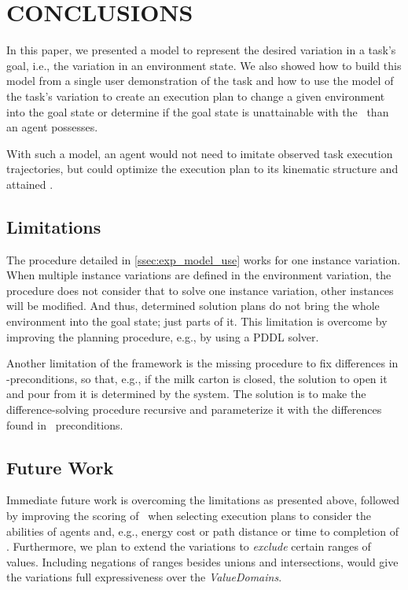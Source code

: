 \section{CONCLUSIONS}
In this paper, we presented a model to represent the desired variation in a task's goal, i.e., the variation in an environment state. We also showed how to build this model from a single user demonstration of the task and how to use the model of the task's variation to create an execution plan to change a given environment into the goal state or determine if the goal state is unattainable with the \skills\ than an agent possesses.

With such a model, an agent would not need to imitate observed task execution trajectories, but could optimize the execution plan to its kinematic structure and attained \skills.

\subsection{Limitations}
The procedure detailed in \ref{ssec:exp_model_use} works for one instance variation. When multiple instance variations are defined in the environment variation, the procedure does not consider that to solve one instance variation, other instances will be modified. And thus, determined solution plans do not bring the whole environment into the goal state; just parts of it. This limitation is overcome by improving the planning procedure, e.g., by using a PDDL solver.


Another limitation of the framework is the missing procedure to fix differences in \skill-preconditions, so that, e.g., if the milk carton is closed, the solution to open it and pour from it is determined by the system. The solution is to make the difference-solving procedure recursive and parameterize it with the differences found in \skill\ preconditions.

\subsection{Future Work}
Immediate future work is overcoming the limitations as presented above, followed by improving the scoring of \skills\ when selecting execution plans to consider the abilities of agents and, e.g., energy cost or path distance or time to completion of \skills. Furthermore, we plan to extend the variations to \textit{exclude} certain ranges of values. Including negations of ranges besides unions and intersections, would give the variations full expressiveness over the \textit{ValueDomains}.

